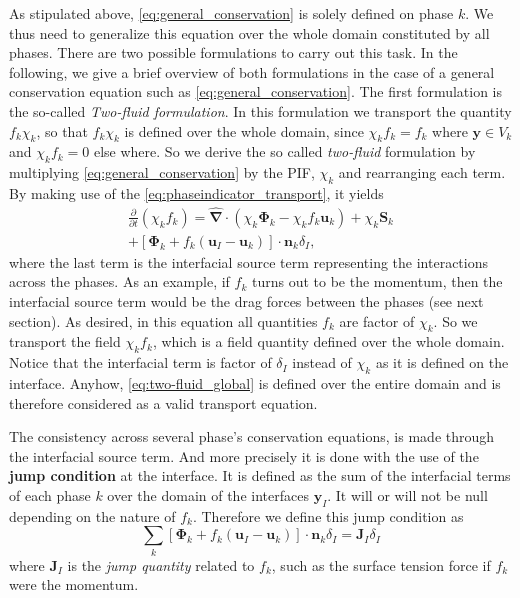 \documentclass[twocolumn]{My_article}
\newcommand{\nablabh}{\hat{\bm{\nabla}}}
\newcommand{\pddt}{\frac{\partial}{\partial t}}
\begin{document}
As stipulated above, \ref{eq:general_conservation} is solely defined on phase $k$.
We thus need to generalize this equation over the whole domain constituted by all phases.
There are two possible formulations to carry out this task.
In the following, we give a brief overview of both formulations in the case of a general conservation equation such as \ref{eq:general_conservation}.
The first formulation is the so-called \textit{Two-fluid formulation}.
In this formulation we transport the quantity $f_k\chi_k$, so that $f_k\chi_k$ is defined over the whole domain, since $\chi_k f_k = f_k$ where $\textbf{y} \in V_k$ and $\chi_k f_k = 0$ else where.
So we derive the so called \textit{two-fluid} formulation by multiplying \ref{eq:general_conservation} by the PIF, $\chi_k$ and rearranging each term.
By making use of the \ref{eq:phaseindicator_transport}, it yields
\begin{multline}
    \pddt (\chi_k f_k)
    = \nablabh \cdot (\chi_k \bm{\Phi}_k - \chi_k f_k \textbf{u}_k)
    + \chi_k \textbf{S}_k\\
    + \left[
        \bm{\Phi}_k
        + f_k
        \left(
            \textbf{u}_I
            - \textbf{u}_k
        \right)
    \right]
    \cdot \textbf{n}_k \delta_I,
    \label{eq:two-fluid_global}
\end{multline}
where the last term is the interfacial source term representing the interactions across the phases.
As an example, if $f_k$ turns out to be the momentum, then the interfacial source term would be the drag forces between the phases (see next section).
As desired, in this equation all quantities $f_k$ are factor of $\chi_k$.
So we transport the field $\chi_k f_k$, which is a field quantity defined over the whole domain.
Notice that the interfacial term is factor of $\delta_I$ instead of $\chi_k$ as it is defined on the interface.
Anyhow, \ref{eq:two-fluid_global} is defined over the entire domain and is therefore considered as a valid transport equation.

The consistency across several phase's conservation equations, is made through the interfacial source term.
And more precisely it is done with the use of the \textbf{jump condition} at the interface.
It is defined as the sum of the interfacial terms of each phase $k$ over the domain of the interfaces $\textbf{y}_I$.
It will or will not be null depending on the nature of $f_k$.
Therefore we define this jump condition as
\begin{equation}
    \sum_k
    \left[
        \bm{\Phi}_k
        + f_k
        \left(
            \textbf{u}_I
            - \textbf{u}_k
        \right)
    \right]
    \cdot \textbf{n}_k\delta_I
    = \textbf{J}_I\delta_I
    \label{eq:general_jump}
\end{equation}
where $\textbf{J}_I$ is the \textit{jump quantity} related to $f_k$, such as the surface tension force if $f_k$ were the momentum.
\end{document}
